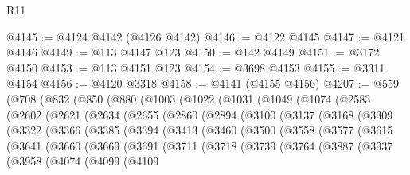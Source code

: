 \begin{lexlean}{R11}
\begin{coremodule}
{{{{{{{{{{{{{{{{{{{{{{{{{{{{{{{{{{{{{{{{{{{{{{{{{{{{{{{{{{{{{{{{{{{{{{{{{{{{{{{{{{{{{{{{{{{{{{{{{{{{{{{{{{@4145 := @4124 @4142 (@4126 @4142)
@4146 := @4122 @4145
@4147 := @4121 @4146
@4149 := @113 @4147 @123
@4150 := @142 @4149
@4151 := @3172 @4150
@4153 := @113 @4151 @123
@4154 := @3698 @4153
@4155 := @3311 @4154
@4156 := @4120 @3318
@4158 := @4141 (@4155 @4156)
@4207 := @559
    (@708
      (@832
        (@850
          (@880
            (@1003
              (@1022
                (@1031
                  (@1049
                    (@1074
                      (@2583
                        (@2602
                          (@2621
                            (@2634
                              (@2655
                                (@2860
                                  (@2894
                                    (@3100
                                      (@3137
                                        (@3168
                                          (@3309
                                            (@3322
                                              (@3366
                                                (@3385
                                                  (@3394
                                                    (@3413
                                                      (@3460
                                                        (@3500
                                                          (@3558
                                                            (@3577
                                                              (@3615
                                                                (@3641
                                                                  (@3660
                                                                    (@3669
                                                                      (@3691
                                                                        (@3711
                                                                          (@3718
                                                                            (@3739
                                                                              (@3764
                                                                                (@3887
                                                                                  (@3937
                                                                                    (@3958
                                                                                      (@4074
                                                                                        (@4099
                                                                                          (@4109
}}}}}}}}}}}}}}}}}}}}}}}}}}}}}}}}}}}}}}}}}}}}}}}}}}}}}}}}}}}}}}}}}}}}}}}}}}}}}}}}}}}}}}}}}}}}}}}}}}}}}}}}}}
\end{coremodule}
\end{lexlean}
